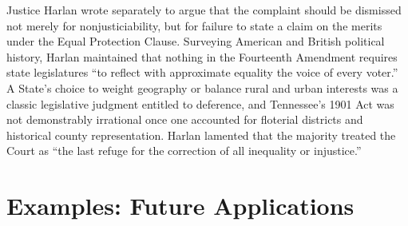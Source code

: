 \documentclass[12pt]{article}
\begin{document}
Justice Harlan wrote separately to argue that the complaint should be dismissed not merely for nonjusticiability, but for failure to state a claim on the merits under the Equal Protection Clause. Surveying American and British political history, Harlan maintained that nothing in the Fourteenth Amendment requires state legislatures ``to reflect with approximate equality the voice of every voter.'' A State's choice to weight geography or balance rural and urban interests was a classic legislative judgment entitled to deference, and Tennessee's 1901 Act was not demonstrably irrational once one accounted for floterial districts and historical county representation. Harlan lamented that the majority treated the Court as ``the last refuge for the correction of all inequality or injustice.''

\section{Examples: Future Applications}
\end{document}
